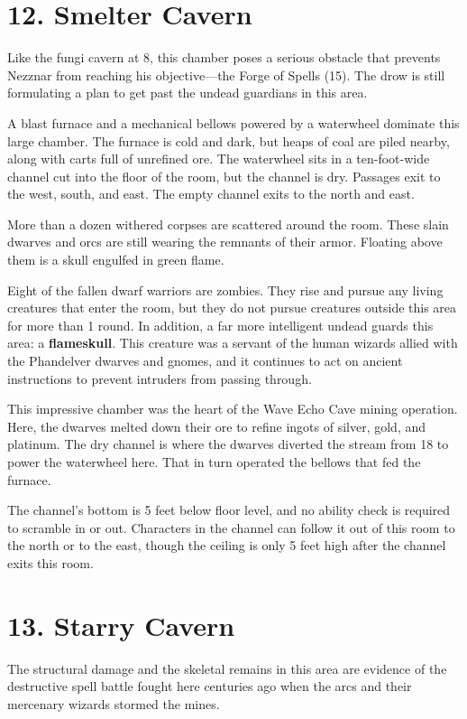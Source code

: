 \documentclass[10pt,a4paper,twoside,bg=print,twocolumn,openany,nodeprecatedcode]{dndbook}
\begin{document}
\section{12. Smelter Cavern}
Like the fungi cavern at 8, this chamber poses a serious obstacle that prevents Nezznar from reaching his objective—the Forge of Spells (15). The drow is still formulating a plan to get past the undead guardians in this area.

\begin{DndReadAloud}{}
A blast furnace and a mechanical bellows powered by a waterwheel dominate this large chamber. The furnace is cold and dark, but heaps of coal are piled nearby, along with carts full of unrefined ore. The waterwheel sits in a ten-foot-wide channel cut into the floor of the room, but the channel is dry. Passages exit to the west, south, and east. The empty channel exits to the north and east.

More than a dozen withered corpses are scattered around the room. These slain dwarves and orcs are still wearing the remnants of their armor. Floating above them is a skull engulfed in green flame.

\end{DndReadAloud}

Eight of the fallen dwarf warriors are zombies. They rise and pursue any living creatures that enter the room, but they do not pursue creatures outside this area for more than 1 round. In addition, a far more intelligent undead guards this area: a \textbf{flameskull}. This creature was a servant of the human wizards allied with the Phandelver dwarves and gnomes, and it continues to act on ancient instructions to prevent intruders from passing through.

This impressive chamber was the heart of the Wave Echo Cave mining operation. Here, the dwarves melted down their ore to refine ingots of silver, gold, and platinum. The dry channel is where the dwarves diverted the stream from 18 to power the waterwheel here. That in turn operated the bellows that fed the furnace.

The channel's bottom is 5 feet below floor level, and no ability check is required to scramble in or out. Characters in the channel can follow it out of this room to the north or to the east, though the ceiling is only 5 feet high after the channel exits this room.

\section{13. Starry Cavern}
The structural damage and the skeletal remains in this area are evidence of the destructive spell battle fought here centuries ago when the arcs and their mercenary wizards stormed the mines.
\end{document}
